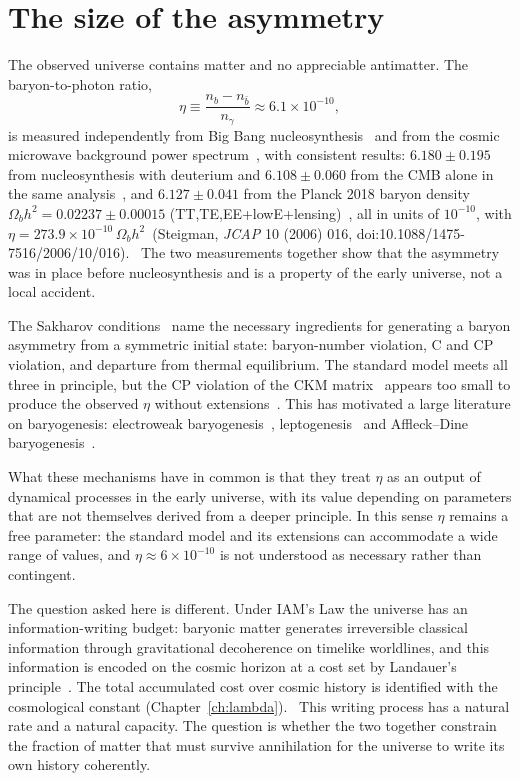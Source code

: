 \section{The size of the asymmetry}
The observed universe contains matter and no appreciable antimatter. The baryon-to-photon ratio,
\begin{equation}\eta\equiv\frac{n_b-n_{\bar b}}{n_\gamma}\approx6.1\times10^{-10},\label{eq:bar_eta}\end{equation}
is measured independently from Big Bang nucleosynthesis~\cite{Cyburt2016} and from the cosmic microwave background power
spectrum~\cite{Planck2018VI}, with consistent results: $6.180\pm0.195$ from nucleosynthesis with deuterium and $6.108\pm0.060$ from the
CMB alone in the same analysis~\cite{Cyburt2016}, and $6.127\pm0.041$ from the Planck 2018 baryon density $\Omega_bh^2=0.02237\pm0.00015$
(TT,TE,EE+lowE+lensing)~\cite{Planck2018VI}, all in units of $10^{-10}$, with $\eta=273.9\times10^{-10}\,\Omega_bh^2$~(Steigman, \emph{JCAP} 10 (2006) 016, doi:\allowbreak{}10.1088/\allowbreak{}1475-7516/\allowbreak{}2006/\allowbreak{}10/\allowbreak{}016).
\observed\ The two measurements together show that the asymmetry was in place before nucleosynthesis and is a property of the early
universe, not a local accident.

The Sakharov conditions~\cite{Sakharov1967} name the necessary ingredients for generating a baryon asymmetry from a symmetric initial
state: baryon-number violation, C and CP violation, and departure from thermal equilibrium. The standard model meets all three in
principle, but the CP violation of the CKM matrix~\cite{KobayashiMaskawa1973} appears too small to produce the observed $\eta$ without
extensions~\cite{Gavela1994}. This has motivated a large literature on baryogenesis: electroweak
baryogenesis~\cite{KuzminRubakovShaposhnikov1985,RubakovShaposhnikov1996}, leptogenesis~\cite{FukugitaYanagida1986,Davidson2008} and
Affleck--Dine baryogenesis~\cite{AffleckDine1985}. \observed

What these mechanisms have in common is that they treat $\eta$ as an output of dynamical processes in the early universe, with its value
depending on parameters that are not themselves derived from a deeper principle. In this sense $\eta$ remains a free parameter: the
standard model and its extensions can accommodate a wide range of values, and $\eta\approx6\times10^{-10}$ is not understood as
necessary rather than contingent. \interp

The question asked here is different. Under IAM's Law the universe has an information-writing budget: baryonic matter generates
irreversible classical information through gravitational decoherence on timelike worldlines, and this information is encoded on the
cosmic horizon at a cost set by Landauer's principle~\cite{Landauer1961}. The total accumulated cost over cosmic history is identified
with the cosmological constant (Chapter~\ref{ch:lambda}). \conjecture\ This writing process has a natural rate and a natural capacity.
The question is whether the two together constrain the fraction of matter that must survive annihilation for the universe to write its
own history coherently.


